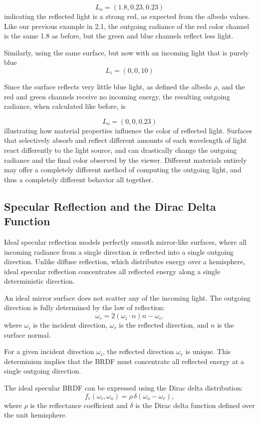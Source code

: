 \documentclass[12pt]{article}
\begin{document}
\[
L_o = (1.8, 0.23, 0.23)
\]
indicating the reflected light is a strong red, as expected from the albedo values. Like our previous example in 2.1, the outgoing radiance of the red color channel is the same 1.8 as before, but the green and blue channels reflect less light.

Similarly, using the same surface, but now with an incoming light that is purely blue 
\[
L_i = (0,0,10)
\]

Since the surface reflects very little blue light, as defined the albedo $\rho$, and the red and green channels receive no incoming energy, the resulting outgoing radiance, when calculated like before, is 

\[
L_o = (0,0,0.23)
\]
illustrating how material properties influence the color of reflected light. Surfaces that selectively absorb and reflect different amounts of each wavelength of light react differently to the light source, and can drastically change the outgoing radiance and the final color observed by the viewer. Different materials entirely may offer a completely different method of computing the outgoing light, and thus a completely different behavior all together.

\subsection{Specular Reflection and the Dirac Delta Function}

Ideal specular reflection models perfectly smooth mirror-like surfaces, where all incoming radiance from a single direction is reflected into a single outgoing direction. Unlike diffuse reflection, which distributes energy over a hemisphere, ideal specular reflection concentrates all reflected energy along a single deterministic direction.
\newline

An ideal mirror surface does not scatter any of the incoming light. The outgoing direction is fully determined by the law of reflection:
\[
\omega_r = 2(\omega_i \cdot n)n - \omega_i,
\]
where \( \omega_i \) is the incident direction, \( \omega_r \) is the reflected direction, and \( n \) is the surface normal.


For a given incident direction \( \omega_i \), the reflected direction \( \omega_r \) is unique. This determinism implies that the BRDF must concentrate all reflected energy at a single outgoing direction.
\newline

The ideal specular BRDF can be expressed using the Dirac delta distribution:
\[
f_r(\omega_i, \omega_o) = \rho \, \delta(\omega_o - \omega_r),
\]
where \( \rho \) is the reflectance coefficient and \( \delta \) is the Dirac delta function defined over the unit hemisphere.
\end{document}
